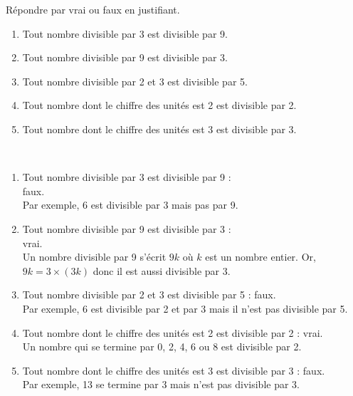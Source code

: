 \begin{exercice*}
   Répondre par vrai ou faux en justifiant.
   \begin{enumerate}
      \item Tout nombre divisible par 3 est divisible par 9.
      \item Tout nombre divisible par 9 est divisible par 3.
      \item Tout nombre divisible par 2 et 3 est divisible par 5.
      \item Tout nombre dont le chiffre des unités est 2 est divisible par 2. 
      \item Tout nombre dont le chiffre des unités est 3 est divisible par 3.
   \end{enumerate}
\end{exercice*}
\begin{corrige}
   \ \\ [-5mm]
   \begin{enumerate}
      \item Tout nombre divisible par 3 est divisible par 9 : \\
         {\red faux}. \\
         Par exemple, 6 est divisible par 3 mais pas par 9.
      \item Tout nombre divisible par 9 est divisible par 3 : \\
         {\red vrai}. \\
         Un nombre divisible par 9 s'écrit $9k$ où $k$ est un nombre entier. Or, $9k =3\times(3k)$ donc il est aussi divisible par 3.
      \item Tout nombre divisible par 2 et 3 est divisible par 5 : {\red faux}. \\
      Par exemple, 6 est divisible par 2 et par 3 mais il n'est pas divisible par 5.
      \item Tout nombre dont le chiffre des unités est 2 est divisible par 2 : {\red vrai}. \\
      Un nombre qui se termine par 0, 2, 4, 6 ou 8 est divisible par 2.
      \item Tout nombre dont le chiffre des unités est 3 est divisible par 3 : {\red faux}. \\
      Par exemple, 13 se termine par 3 mais n'est pas divisible par 3.
   \end{enumerate}
\end{corrige}